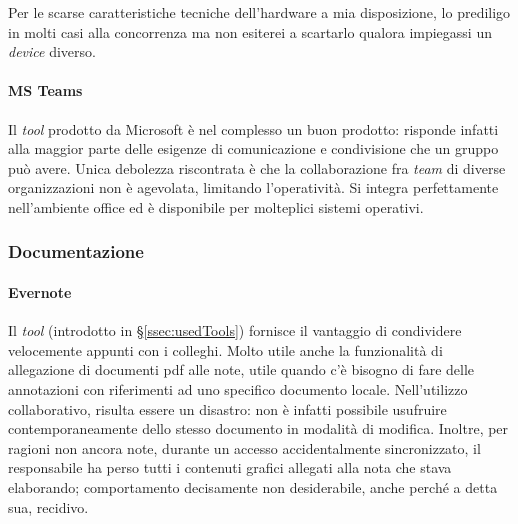 Per le scarse caratteristiche tecniche dell'hardware a mia disposizione, lo prediligo in molti casi alla concorrenza ma non esiterei a scartarlo qualora impiegassi un \textit{device} diverso.
\newpage
\paragraph{MS Teams}
Il \textit{tool} prodotto da Microsoft è nel complesso un buon prodotto: risponde infatti alla maggior parte delle esigenze di comunicazione e condivisione che un gruppo può avere. Unica debolezza riscontrata è che la collaborazione fra \textit{team} di diverse organizzazioni non è agevolata, limitando l'operatività.
Si integra perfettamente nell'ambiente \gls{office} ed è disponibile per molteplici sistemi operativi.
\subsubsection{Documentazione}
\paragraph{Evernote}
Il \textit{tool} (introdotto in \S\ref{ssec:usedTools}) fornisce il vantaggio di condividere velocemente appunti con i colleghi. Molto utile anche la funzionalità di allegazione di documenti pdf alle note, utile quando c'è bisogno di fare delle annotazioni con riferimenti ad uno specifico documento locale. Nell'utilizzo collaborativo, risulta essere un disastro: non è infatti possibile usufruire contemporaneamente dello stesso documento in modalità di modifica. Inoltre, per ragioni non ancora note, durante un accesso accidentalmente sincronizzato, il responsabile ha perso tutti i contenuti grafici allegati alla nota che stava elaborando; comportamento decisamente non desiderabile, anche perché a detta sua, recidivo.

